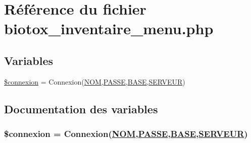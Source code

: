 \hypertarget{biotox__inventaire__menu_8php}{
\section{R\'{e}f\'{e}rence du fichier biotox\_\-inventaire\_\-menu.php}
\label{biotox__inventaire__menu_8php}
}
\subsection*{Variables}
\begin{CompactItemize}
\item 
\hyperlink{biotox__inventaire__menu_8php_a0}{\$connexion} = Connexion(\hyperlink{pma__connect_8php_a0}{NOM},\hyperlink{pma__connect_8php_a1}{PASSE},\hyperlink{pma__connect_8php_a3}{BASE},\hyperlink{pma__connect_8php_a2}{SERVEUR})
\end{CompactItemize}


\subsection{Documentation des variables}
\hypertarget{biotox__inventaire__menu_8php_a0}{
\subsubsection[\$connexion]{\setlength{\rightskip}{0pt plus 5cm}\$connexion = Connexion(\hyperlink{pma__connect_8php_a0}{NOM},\hyperlink{pma__connect_8php_a1}{PASSE},\hyperlink{pma__connect_8php_a3}{BASE},\hyperlink{pma__connect_8php_a2}{SERVEUR})}}
\label{biotox__inventaire__menu_8php_a0}



